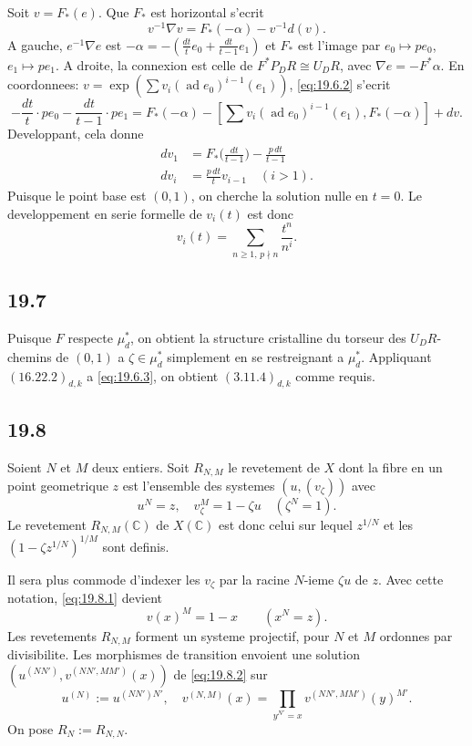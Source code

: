 \documentclass[12pt,a4paper]{article}
\theoremstyle{plain}
\theoremstyle{definition}
\theoremstyle{remark}
\DeclareMathOperator{\ad}{ad}
\newcommand{\dR}{DR}
\newcommand{\CC}{\mathbb{C}}
\begin{document}
Soit $v = F_*(e)$. Que $F_*$ est horizontal s'ecrit
\begin{equation}\label{eq:19.6.2}
v^{-1} \nabla v = F_*(-\alpha) - v^{-1} d(v).
\end{equation}
A gauche, $e^{-1} \nabla e$ est $-\alpha = -(\frac{dt}{t} e_0 +
\frac{dt}{t-1} e_1)$ et $F_*$ est l'image par $e_0 \mapsto p e_0$,
$e_1 \mapsto p e_1$. A droite, la connexion est celle de
$F^* P_\dR \cong U_\dR$, avec $\nabla e = -F^*\alpha$. En coordonnees:
$v = \exp(\sum v_i (\ad e_0)^{i-1}(e_1))$, \eqref{eq:19.6.2} s'ecrit
\[
-\frac{dt}{t} \cdot p e_0 - \frac{dt}{t-1} \cdot p e_1 = F_*(-\alpha) -
[\sum v_i (\ad e_0)^{i-1}(e_1), F_*(-\alpha)] + dv.
\]
Developpant, cela donne
\begin{align*}
dv_1 &= F_*\bigl(\frac{dt}{t-1}\bigr) - \frac{p\,dt}{t-1} \\
dv_i &= \frac{p\,dt}{t} v_{i-1} \quad (i > 1).
\end{align*}
Puisque le point base est $(0,1)$, on cherche la solution nulle en
$t=0$. Le developpement en serie formelle de $v_i(t)$ est donc
\begin{equation}\label{eq:19.6.3}
v_i(t) = \sum_{n \geq 1,\, p \nmid n} \frac{t^n}{n^i}.
\end{equation}

\subsection{19.7}

Puisque $F$ respecte $\mu_d^*$, on obtient la structure cristalline
du torseur des $U_\dR$-chemins de $(0,1)$ a $\zeta \in \mu_d^*$
simplement en se restreignant a $\mu_d^*$. Appliquant
$(16.22.2)_{d,k}$ a \eqref{eq:19.6.3}, on obtient $(3.11.4)_{d,k}$
comme requis.

\subsection{19.8}

Soient $N$ et $M$ deux entiers. Soit $R_{N,M}$ le revetement de $X$
dont la fibre en un point geometrique $z$ est l'ensemble des systemes
$(u, (v_\zeta))$ avec
\begin{equation}\label{eq:19.8.1}
u^N = z, \quad v_\zeta^M = 1 - \zeta u \quad (\zeta^N = 1).
\end{equation}
Le revetement $R_{N,M}(\CC)$ de $X(\CC)$ est donc celui sur lequel
$z^{1/N}$ et les $(1 - \zeta z^{1/N})^{1/M}$ sont definis.

Il sera plus commode d'indexer les $v_\zeta$ par la racine $N$-ieme
$\zeta u$ de $z$. Avec cette notation, \eqref{eq:19.8.1} devient
\begin{equation}\label{eq:19.8.2}
v(x)^M = 1 - x \qquad (x^N = z).
\end{equation}
Les revetements $R_{N,M}$ forment un systeme projectif, pour $N$ et
$M$ ordonnes par divisibilite. Les morphismes de transition envoient
une solution $(u^{(NN')}, v^{(NN',MM')}(x))$ de \eqref{eq:19.8.2} sur
\begin{equation}\label{eq:19.8.3}
u^{(N)} := u^{(NN')N'}, \quad v^{(N,M)}(x) =
\prod_{y^{N'}=x} v^{(NN',MM')}(y)^{M'}.
\end{equation}
On pose $R_N := R_{N,N}$.
\end{document}
